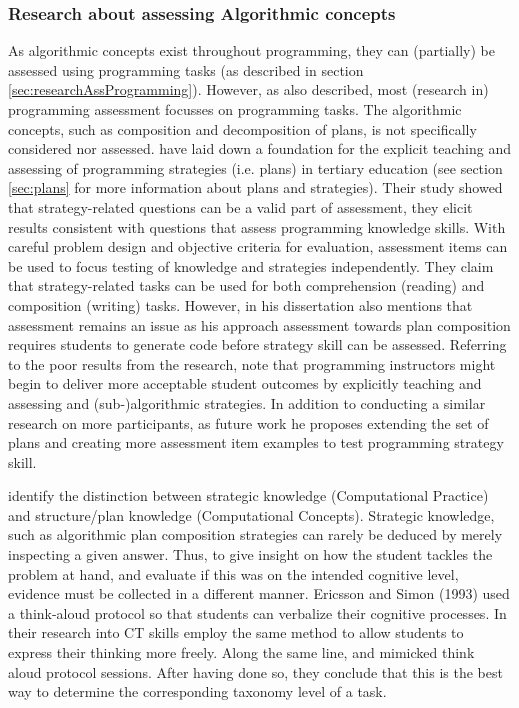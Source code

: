 \subsubsection{Research about assessing Algorithmic concepts}
As algorithmic concepts exist throughout programming, they can (partially) be assessed using programming tasks (as described in section \ref{sec:researchAssProgramming}). However, as also described, most (research in) programming assessment focusses on programming tasks. The algorithmic concepts, such as composition and decomposition of plans, is not specifically considered nor assessed.  have laid down a foundation for the explicit teaching and assessing of programming strategies (i.e. plans) in tertiary education (see section \ref{sec:plans} for more information about plans and strategies). Their study showed that strategy-related questions can be a valid part of assessment, they elicit results consistent with questions that assess programming knowledge skills. With careful problem design and objective criteria for evaluation, assessment items can be used to focus testing of knowledge and strategies independently. They claim that strategy-related tasks can be used for both comprehension (reading) and composition (writing) tasks. However, in his dissertation \citeauthor{deRaadt2008} also mentions that assessment remains an issue as his approach assessment towards plan composition requires students to generate code before strategy skill can be assessed. Referring to the poor results from the  research,  note that programming instructors might begin to deliver more acceptable student outcomes by explicitly teaching and assessing and (sub-)algorithmic strategies. In addition to conducting a similar research on more participants, as future work he proposes extending the set of plans and creating more assessment item examples to test programming strategy skill.



\cite{BrennanResnick2012} identify the distinction between strategic knowledge (Computational Practice) and structure/plan knowledge (Computational Concepts). Strategic knowledge, such as algorithmic plan composition strategies can rarely be deduced by merely inspecting a given answer. Thus, to give insight on how the student tackles the problem at hand, and evaluate if this was on the intended cognitive level, evidence must be collected in a different manner.  Ericsson and Simon (1993) used a think-aloud protocol so that students can verbalize their cognitive processes. In their research into CT skills  employ the same method to allow students to express their thinking more freely. Along the same line,  and  mimicked  think aloud protocol sessions. After having done so, they conclude that this is the best way to determine the corresponding taxonomy level of a task.



